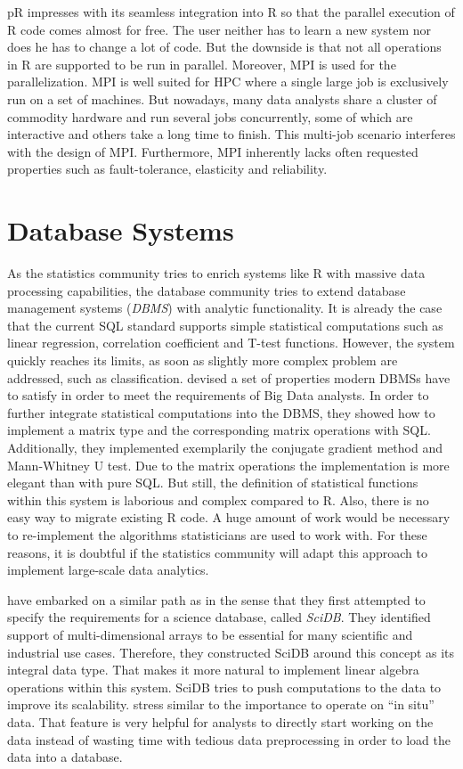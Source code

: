 pR impresses with its seamless integration into R so that the parallel execution of R code comes almost for free.
The user neither has to learn a new system nor does he has to change a lot of code.
But the downside is that not all operations in R are supported to be run in parallel.
Moreover, MPI is used for the parallelization.
MPI is well suited for HPC where a single large job is exclusively run on a set of machines.
But nowadays, many data analysts share a cluster of commodity hardware and run several jobs concurrently, some of which are interactive and others take a long time to finish.
This multi-job scenario interferes with the design of MPI.
Furthermore, MPI inherently lacks often requested properties such as fault-tolerance, elasticity and reliability.

\section{Database Systems}

As the statistics community tries to enrich systems like R with massive data processing capabilities, the database community tries to extend database management systems (\emph{DBMS}) with analytic functionality.
It is already the case that the current SQL standard supports simple statistical computations such as linear regression, correlation coefficient and T-test functions.
However, the system quickly reaches its limits, as soon as slightly more complex problem are addressed, such as classification.
\textcite{cohen:pve2009a} devised a set of properties modern DBMSs have to satisfy in order to meet the requirements of Big Data analysts.
In order to further integrate statistical computations into the DBMS, they showed how to implement a matrix type and the corresponding matrix operations with SQL.
Additionally, they implemented exemplarily the conjugate gradient method and Mann-Whitney U test.
Due to the matrix operations the implementation is more elegant than with pure SQL.
But still, the definition of statistical functions within this system is laborious and complex compared to R.
Also, there is no easy way to migrate existing R code.
A huge amount of work would be necessary to re-implement the algorithms statisticians are used to work with.
For these reasons, it is doubtful if the statistics community will adapt this approach to implement large-scale data analytics.

\Textcite{stonebraker:2009a} have embarked on a similar path as \citeauthor{cohen:pve2009a} in the sense that they first attempted to specify the requirements for a science database, called \emph{SciDB}.
They identified support of multi-dimensional arrays to be essential for many scientific and industrial use cases.
Therefore, they constructed SciDB around this concept as its integral data type.
That makes it more natural to implement linear algebra operations within this system.
SciDB tries to push computations to the data to improve its scalability.
\citeauthor{stonebraker:2009a} stress similar to \citeauthor{cohen:pve2009a} the importance to operate on ``in situ'' data.
That feature is very helpful for analysts to directly start working on the data instead of wasting time with tedious data preprocessing in order to load the data into a database.


